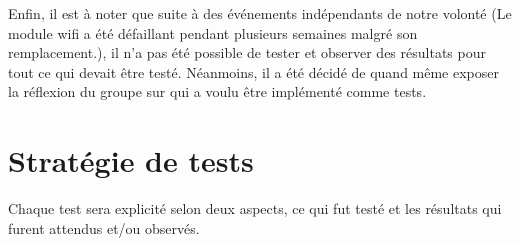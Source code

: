 \documentclass[11pt,a4paper,11pt]{report}
\begin{document}
Enfin, il est à noter que suite à des événements indépendants de notre volonté (Le module wifi a été défaillant pendant plusieurs semaines malgré son remplacement.), il n'a pas été possible de tester et observer des résultats pour tout ce qui devait être testé. Néanmoins, il a été décidé de quand même exposer la réflexion du groupe sur qui a voulu être implémenté comme tests.\\

\section{Stratégie de tests}
Chaque test sera explicité selon deux aspects, ce qui fut testé et les résultats qui furent attendus et/ou observés.



\end{document}
